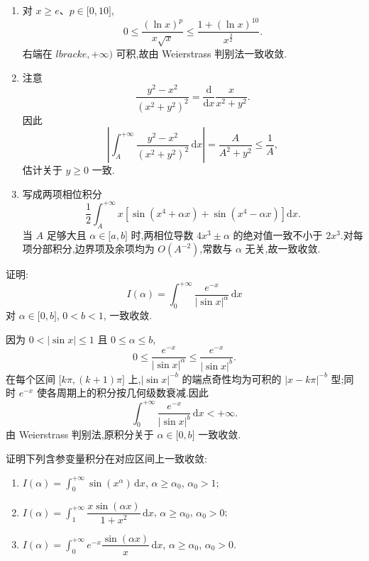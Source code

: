 \begin{solution}
    \begin{enumerate}
        \item 对 $x\geq e$、$p\in\lbrack0,10\rbrack$,
              \[
                  0\leq\dfrac{(\ln x)^p}{x\sqrt x}
                  \leq\dfrac{1+(\ln x)^{10}}{x^{\frac{3}{2}}}.
              \]
              右端在 $lbrack e,+\infty)$ 可积,故由 Weierstrass 判别法一致收敛.
        \item 注意
              \[
                  \dfrac{y^2-x^2}{(x^2+y^2)^2}
                  =\dfrac{\mathrm{d}}{\mathrm{d}x}\dfrac{x}{x^2+y^2}.
              \]
              因此
              \[
                  \left|\int_A^{+\infty}\dfrac{y^2-x^2}{(x^2+y^2)^2}\,\mathrm{d}x\right|
                  =\dfrac{A}{A^2+y^2}\leq\dfrac{1}{A},
              \]
              估计关于 $y\geq0$ 一致.
        \item 写成两项相位积分
              \[
                  \dfrac{1}{2}\int_A^{+\infty}x
                  \left[\sin(x^4+\alpha x)+\sin(x^4-\alpha x)\right]\mathrm{d}x.
              \]
              当 $A$ 足够大且 $\alpha\in\lbrack a,b\rbrack$ 时,两相位导数
              $4x^3\pm\alpha$ 的绝对值一致不小于 $2x^3$.对每项分部积分,边界项及余项均为 $O(A^{-2})$,常数与 $\alpha$ 无关,故一致收敛.
    \end{enumerate}
\end{solution}

\begin{example}
    证明:
    \[
        I(\alpha)=\int_0^{+\infty}\dfrac{e^{-x}}{|\sin x|^\alpha}\,\mathrm{d}x
    \]
    对 $\alpha\in\lbrack0,b\rbrack$, $0<b<1$, 一致收敛.
\end{example}
\exampleblank

\begin{solution}
    因为 $0<|\sin x|\leq1$ 且 $0\leq\alpha\leq b$,
    \[
        0\leq\dfrac{e^{-x}}{|\sin x|^\alpha}
        \leq\dfrac{e^{-x}}{|\sin x|^b}.
    \]
    在每个区间 $\lbrack k\pi,(k+1)\pi\rbrack$ 上,$|\sin x|^{-b}$ 的端点奇性均为可积的 $|x-k\pi|^{-b}$ 型;同时 $e^{-x}$ 使各周期上的积分按几何级数衰减.因此
    \[
        \int_0^{+\infty}\dfrac{e^{-x}}{|\sin x|^b}\,\mathrm{d}x<+\infty.
    \]
    由 Weierstrass 判别法,原积分关于 $\alpha\in\lbrack0,b\rbrack$ 一致收敛.
\end{solution}

\begin{example}
    证明下列含参变量积分在对应区间上一致收敛:
    \begin{enumerate}
        \item $\displaystyle I(\alpha)=\int_0^{+\infty}\sin(x^\alpha)\,\mathrm{d}x$, $\alpha\geq\alpha_0$, $\alpha_0>1$;
        \item $\displaystyle I(\alpha)=\int_1^{+\infty}\dfrac{x\sin(\alpha x)}{1+x^2}\,\mathrm{d}x$, $\alpha\geq\alpha_0$, $\alpha_0>0$;
        \item $\displaystyle I(\alpha)=\int_0^{+\infty}e^{-x}\dfrac{\sin(\alpha x)}{x}\,\mathrm{d}x$, $\alpha\geq\alpha_0$, $\alpha_0>0$.
    \end{enumerate}
\end{example}
\exampleblank

